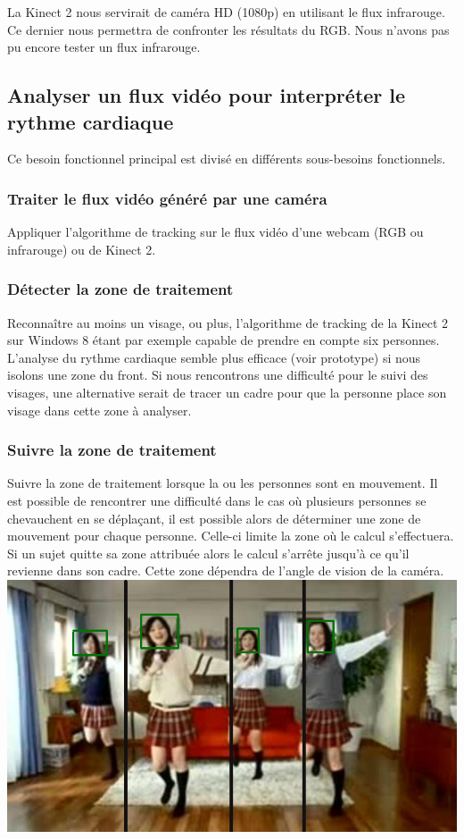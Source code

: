 \documentclass[12pt,a4paper]{article}
\begin{document}
La Kinect 2 nous servirait de caméra HD (1080p) en utilisant le flux infrarouge. Ce dernier nous permettra de confronter les résultats du RGB. Nous n'avons pas pu encore tester un flux infrarouge.

\subsection{Analyser un flux vidéo pour interpréter le rythme cardiaque}
Ce besoin fonctionnel principal est divisé en différents sous-besoins fonctionnels.

\subsubsection{Traiter le flux vidéo généré par une caméra}

Appliquer l'algorithme de tracking sur le flux vidéo d'une webcam (RGB ou infrarouge) ou de Kinect 2.

\subsubsection{Détecter la zone de traitement}

Reconnaître au moins un visage, ou plus, l'algorithme de tracking de la Kinect 2 sur Windows 8 étant par exemple capable de prendre en compte six personnes.
L'analyse du rythme cardiaque semble plus efficace (voir prototype) si nous isolons une zone du front.
Si nous rencontrons une difficulté pour le suivi des visages, une alternative serait de tracer un cadre pour que la personne place son visage dans cette zone à analyser.

\subsubsection{Suivre la zone de traitement}

Suivre la zone de traitement lorsque la ou les personnes sont en mouvement. Il est possible de rencontrer une difficulté dans le cas où plusieurs personnes se chevauchent en se déplaçant, il est possible alors de déterminer une zone de mouvement pour chaque personne. Celle-ci limite la zone où le calcul s'effectuera. Si un sujet quitte sa zone attribuée alors le calcul s'arrête jusqu'à ce qu'il revienne dans son cadre.  Cette zone dépendra de l'angle de vision de la caméra.\\

\includegraphics[scale=0.60]{zone_mouvement.png}
\end{document}
